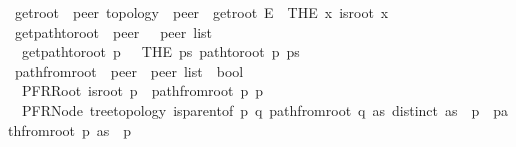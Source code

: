 \begin{isabellebody}
\isanewline
{}\isamarkupfalse%
\ get{\isacharunderscore}{\kern0pt}root\ {\isacharcolon}{\kern0pt}{\isacharcolon}{\kern0pt}\ {\isachardoublequoteopen}{\isacharprime}{\kern0pt}peer\ topology\ {\isasymRightarrow}\ {\isacharprime}{\kern0pt}peer{\isachardoublequoteclose}\ \ {\isachardoublequoteopen}get{\isacharunderscore}{\kern0pt}root\ E\ {\isacharequal}{\kern0pt}\ {\isacharparenleft}{\kern0pt}THE\ x{\isachardot}{\kern0pt}\ is{\isacharunderscore}{\kern0pt}root\ x{\isacharparenright}{\kern0pt}{\isachardoublequoteclose}\isanewline
\isanewline
{}\isamarkupfalse%
\ get{\isacharunderscore}{\kern0pt}path{\isacharunderscore}{\kern0pt}to{\isacharunderscore}{\kern0pt}root\ {\isacharcolon}{\kern0pt}{\isacharcolon}{\kern0pt}\ {\isachardoublequoteopen}{\isacharprime}{\kern0pt}peer\ {\isasymRightarrow}\ \ {\isacharprime}{\kern0pt}peer\ list{\isachardoublequoteclose}\ \isanewline
\ \ {\isachardoublequoteopen}get{\isacharunderscore}{\kern0pt}path{\isacharunderscore}{\kern0pt}to{\isacharunderscore}{\kern0pt}root\ p\ {\isasymequiv}\ \ {\isacharparenleft}{\kern0pt}THE\ ps{\isachardot}{\kern0pt}\ path{\isacharunderscore}{\kern0pt}to{\isacharunderscore}{\kern0pt}root\ p\ ps{\isacharparenright}{\kern0pt}{\isachardoublequoteclose}\isanewline
\isanewline
{}\isamarkupfalse%
\ path{\isacharunderscore}{\kern0pt}from{\isacharunderscore}{\kern0pt}root\ {\isacharcolon}{\kern0pt}{\isacharcolon}{\kern0pt}\ {\isachardoublequoteopen}{\isacharprime}{\kern0pt}peer\ {\isasymRightarrow}\ {\isacharprime}{\kern0pt}peer\ list\ {\isasymRightarrow}\ bool{\isachardoublequoteclose}\ \isanewline
\ \ PFRRoot{\isacharcolon}{\kern0pt}\ {\isachardoublequoteopen}{\isasymlbrakk}is{\isacharunderscore}{\kern0pt}root\ p{\isasymrbrakk}\ {\isasymLongrightarrow}\ path{\isacharunderscore}{\kern0pt}from{\isacharunderscore}{\kern0pt}root\ p\ {\isacharbrackleft}{\kern0pt}p{\isacharbrackright}{\kern0pt}{\isachardoublequoteclose}\ {\isacharbar}{\kern0pt}\isanewline
\ \ PFRNode{\isacharcolon}{\kern0pt}\ {\isachardoublequoteopen}{\isasymlbrakk}tree{\isacharunderscore}{\kern0pt}topology{\isacharsemicolon}{\kern0pt}\ is{\isacharunderscore}{\kern0pt}parent{\isacharunderscore}{\kern0pt}of\ p\ q{\isacharsemicolon}{\kern0pt}\ path{\isacharunderscore}{\kern0pt}from{\isacharunderscore}{\kern0pt}root\ q\ as{\isacharsemicolon}{\kern0pt}\ distinct\ {\isacharparenleft}{\kern0pt}as\ {\isacharat}{\kern0pt}\ {\isacharbrackleft}{\kern0pt}p{\isacharbrackright}{\kern0pt}{\isacharparenright}{\kern0pt}{\isasymrbrakk}\ {\isasymLongrightarrow}\ path{\isacharunderscore}{\kern0pt}from{\isacharunderscore}{\kern0pt}root\ p\ {\isacharparenleft}{\kern0pt}as\ {\isacharat}{\kern0pt}\ {\isacharbrackleft}{\kern0pt}p{\isacharbrackright}{\kern0pt}{\isacharparenright}{\kern0pt}{\isachardoublequoteclose}\isanewline

\end{isabellebody}
